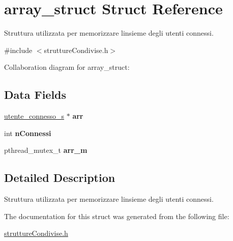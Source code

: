\hypertarget{structarray__struct}{}\section{array\+\_\+struct Struct Reference}
\label{structarray__struct}


Struttura utilizzata per memorizzare l\textquotesingle{}insieme degli utenti connessi.  




{\ttfamily \#include $<$strutture\+Condivise.\+h$>$}



Collaboration diagram for array\+\_\+struct\+:
\subsection*{Data Fields}
\begin{DoxyCompactItemize}
\item 
\mbox{\label{structarray__struct_a6872838a897745a89a9a8fe350aeb086}} 
\hyperlink{structutente__connesso}{utente\+\_\+connesso\+\_\+s} $\ast$ {\bfseries arr}
\item 
\mbox{\label{structarray__struct_a7ee6e1f8f3a131f25080db380338f606}} 
int {\bfseries n\+Connessi}
\item 
\mbox{\label{structarray__struct_a66c015c1b17a9b7b368acef3d30c64d0}} 
pthread\+\_\+mutex\+\_\+t {\bfseries arr\+\_\+m}
\end{DoxyCompactItemize}


\subsection{Detailed Description}
Struttura utilizzata per memorizzare l\textquotesingle{}insieme degli utenti connessi. 

The documentation for this struct was generated from the following file\+:\begin{DoxyCompactItemize}
\item 
\hyperlink{strutture_condivise_8h}{strutture\+Condivise.\+h}\end{DoxyCompactItemize}
